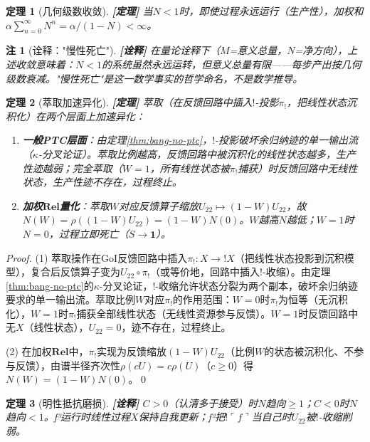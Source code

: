 \documentclass[11pt,a4paper]{article}
\newtheorem{theorem}{定理}
\newtheorem{remark}{注}
\newcommand{\lvl}[1]{\hfill\textbf{\footnotesize[#1]}}
\newcommand{\lvP}{\lvl{定理}}
\newcommand{\lvI}{\lvl{诠释}}
\newcommand{\I}{\mathbf{1}}
\newcommand{\bang}{{!}}
\begin{document}
\begin{theorem}[几何级数收敛]\label{thm:slow-death}\lvP
当$N<1$时，即使过程永远运行（生产性），加权和$\alpha\sum_{n=0}^\infty N^n=\alpha/(1-N)<\infty$。
\end{theorem}

\begin{remark}[诠释："慢性死亡"]\lvI
在量论诠释下（$M$=意义总量，$N$=净方向），上述收敛意味着：$N<1$的系统虽然永远运转，但意义总量有限——每步产出按几何级数衰减。"慢性死亡"是这一数学事实的哲学命名，不是数学推导。
\end{remark}

\begin{theorem}[萃取加速异化]\label{thm:extraction-alienation}\lvP
萃取（在反馈回路中插入$\bang$-投影$\pi_!$，把线性状态沉积化）在两个层面上加速异化：
\begin{enumerate}
  \item \textbf{一般PTC层面}：由定理\ref{thm:bang-no-ptc}，$\bang$-投影破坏余归纳迹的单一输出流（$\kappa$-分叉论证）。萃取比例越高，反馈回路中被沉积化的线性状态越多，生产性迹越弱；完全萃取（$W=1$，所有线性状态被$\pi_!$捕获）时反馈回路中无线性状态，生产性迹不存在，过程终止。
  \item \textbf{加权$\mathbf{Rel}$量化}：萃取$W$对应反馈算子缩放$U_{22}\mapsto(1-W)U_{22}$，故$N(W)=\rho((1-W)U_{22})=(1-W)N(0)$。$W$越高$N$越低；$W=1$时$N=0$，过程立即死亡（$S\to\I$）。
\end{enumerate}
\end{theorem}

\begin{proof}
(1) 萃取操作在GoI反馈回路中插入$\pi_!:X\to\bang X$（把线性状态投影到沉积模型），复合后反馈算子变为$U_{22}\circ\pi_!$（或等价地，回路中插入$\bang$-收缩）。由定理\ref{thm:bang-no-ptc}的$\kappa$-分叉论证，$\bang$-收缩允许状态分裂为两个副本，破坏余归纳迹要求的单一输出流。萃取比例$W$对应$\pi_!$的作用范围：$W=0$时$\pi_!$为恒等（无沉积化），$W=1$时$\pi_!$捕获全部线性状态（无线性资源参与反馈）。$W=1$时反馈回路中无$X$（线性状态），$U_{22}=0$，迹不存在，过程终止。

(2) 在加权$\mathbf{Rel}$中，$\pi_!$实现为反馈缩放$(1-W)U_{22}$（比例$W$的状态被沉积化、不参与反馈），由谱半径齐次性$\rho(cU)=c\rho(U)$（$c\geq0$）得$N(W)=(1-W)N(0)$。\qed
\end{proof}

\begin{theorem}[明性抵抗磨损]\label{thm:mingxing-resists}\lvI
$C>0$（认清多于接受）时$N$趋向$\geq1$；$C<0$时$N$趋向$<1$。f³运行时线性过程$X$保持自我更新；f²把$\bang\ulcorner f\urcorner$当自己时$U_{22}$被$\bang$-收缩削弱。
\end{theorem}
\end{document}
